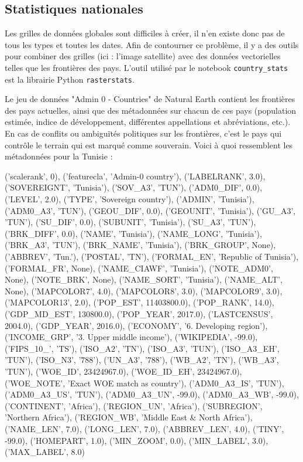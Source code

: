 \documentclass[a4paper, 11pt]{report}
\begin{document}
\subsection{Statistiques nationales}
Les grilles de données globales sont difficiles à créer, il n'en existe donc pas de tous les types et toutes les dates. Afin de contourner ce problème, il y a des outils pour combiner des grilles (ici : l'image satellite) avec des données vectorielles telles que les frontières des pays. L'outil utilisé par le notebook \texttt{country\_stats} est la librairie Python \texttt{rasterstats}.

Le jeu de données "Admin 0 - Countries" de Natural Earth \cite{naturalearthdata} contient les frontières des pays actuelles, ainsi que des métadonnées sur chacun de ces pays (population estimée, indice de développement, différentes appellations et abréviations, etc.). En cas de conflits ou ambiguïtés politiques sur les frontières, c'est le pays qui contrôle le terrain qui est marqué comme souverain. Voici à quoi ressemblent les métadonnées pour la Tunisie :\\
\begin{minipage}[t]{1.0\textwidth}
			{('scalerank', 0), ('featurecla', 'Admin-0 country'), ('LABELRANK', 3.0), ('SOVEREIGNT', 'Tunisia'), ('SOV\_A3', 'TUN'), ('ADM0\_DIF', 0.0), ('LEVEL', 2.0), ('TYPE', 'Sovereign country'), ('ADMIN', 'Tunisia'), ('ADM0\_A3', 'TUN'), ('GEOU\_DIF', 0.0), ('GEOUNIT', 'Tunisia'), ('GU\_A3', 'TUN'), ('SU\_DIF', 0.0), ('SUBUNIT', 'Tunisia'), ('SU\_A3', 'TUN'), ('BRK\_DIFF', 0.0), ('NAME', 'Tunisia'), ('NAME\_LONG', 'Tunisia'), ('BRK\_A3', 'TUN'), ('BRK\_NAME', 'Tunisia'), ('BRK\_GROUP', None), ('ABBREV', 'Tun.'), ('POSTAL', 'TN'), ('FORMAL\_EN', 'Republic of Tunisia'), ('FORMAL\_FR', None), ('NAME\_CIAWF', 'Tunisia'), ('NOTE\_ADM0', None), ('NOTE\_BRK', None), ('NAME\_SORT', 'Tunisia'), ('NAME\_ALT', None), ('MAPCOLOR7', 4.0), ('MAPCOLOR8', 3.0), ('MAPCOLOR9', 3.0), ('MAPCOLOR13', 2.0), ('POP\_EST', 11403800.0), ('POP\_RANK', 14.0), ('GDP\_MD\_EST', 130800.0), ('POP\_YEAR', 2017.0), ('LASTCENSUS', 2004.0), ('GDP\_YEAR', 2016.0), ('ECONOMY', '6. Developing region'), ('INCOME\_GRP', '3. Upper middle income'), ('WIKIPEDIA', -99.0), ('FIPS\_10\_', 'TS'), ('ISO\_A2', 'TN'), ('ISO\_A3', 'TUN'), ('ISO\_A3\_EH', 'TUN'), ('ISO\_N3', '788'), ('UN\_A3', '788'), ('WB\_A2', 'TN'), ('WB\_A3', 'TUN'), ('WOE\_ID', 23424967.0), ('WOE\_ID\_EH', 23424967.0), ('WOE\_NOTE', 'Exact WOE match as country'), ('ADM0\_A3\_IS', 'TUN'), ('ADM0\_A3\_US', 'TUN'), ('ADM0\_A3\_UN', -99.0), ('ADM0\_A3\_WB', -99.0),	 ('CONTINENT', 'Africa'), ('REGION\_UN', 'Africa'), ('SUBREGION', 'Northern Africa'), ('REGION\_WB', 'Middle East \& North Africa'), ('NAME\_LEN', 7.0), ('LONG\_LEN', 7.0), ('ABBREV\_LEN', 4.0), ('TINY', -99.0), ('HOMEPART', 1.0), ('MIN\_ZOOM', 0.0), ('MIN\_LABEL', 3.0), ('MAX\_LABEL', 8.0)}
\end{minipage}\\
\end{document}
